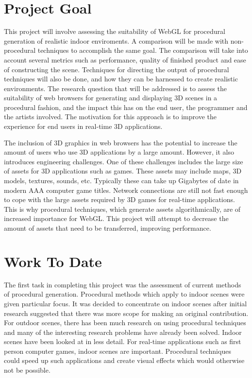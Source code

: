 \documentclass[12pt]{article}
\begin{document}
\maketitle

\clearpage

\section{Project Goal}
This project will involve assessing the suitability of WebGL for procedural generation of realistic indoor enviroments. 
A comparison will be made with non-procedural techniques to accomplish the same goal.
The comparison will take into account several metrics such as performance, quality of finished product and ease of constructing the scene.
Techniques for directing the output of procedural techniques will also be done, and how they can be harnessed to create realistic environments.
The research question that will be addressed is to assess the suitability of web browsers for generating and displaying 3D scenes in a procedural fashion, and the impact this has on the end user, the programmer and the artists involved.
The motivation for this approach is to improve the experience for end users in real-time 3D applications.

The inclusion of 3D graphics in web browsers has the potential to increase the amount of users who use 3D applications by a large amount.
However, it also introduces engineering challenges.
One of these challenges includes the large size of assets for 3D applications such as games.
These assets may include maps, 3D models, textures, sounds, etc.
Typically these can take up Gigabytes of date in modern AAA computer game titles.
Network connections are still not fast enough to cope with the large assets required by 3D games for real-time applications.
This is why procedural techniques, which generate assets algorithmically, are of increased importance for WebGL.
This project will attempt to decrease the amount of assets that need to be transferred, improving performance.

\section{Work To Date}
The first task in completing this project was the assessment of current methods of procedural generation.
Procedural methods which apply to indoor scenes were given particular focus.
It was decided to concentrate on indoor scenes after initial research suggested that there was more scope for making an original contribution.
For outdoor scenes, there has been much research on using procedural techniques and many of the interesting research problems have already been solved.
Indoor scenes have been looked at in less detail. 
For real-time applications such as first person computer games, indoor scenes are important. 
Procedural techniques could speed up such applications and create visual effects which would otherwise not be possible.
\end{document}
